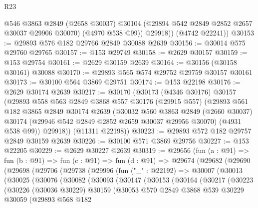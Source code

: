 \begin{lexlean}{R23}
\begin{coremodule}
            @546
            @3863
            @2849
            (@2658 @30037)
            @30104
            (@29894 @542 @2849 @2852 @2657 @30037 @29906 @30070)
            (@4970 @538 @99))
          @29918))
      (@4742 @22241))
@30153 := @29893 @576 @182 @29766 @2849 @30088 @2639
@30156 := @30014 @575 @29760 @29765
@30157 := @153 @29749
@30158 := @2629 @30157
@30159 := @153 @29754
@30161 := @2629 @30159 @2639
@30164 := @30156 (@30158 @30161) @30088
@30170 := @29893 @565 @574 @29752 @29759 @30157 @30161
@30173 := @30100 @564 @3869 @29751
@30174 := @153 @22198
@30176 := @2629 @30174 @2639
@30217 := @30170
    (@30173
      (@4346 @30176)
      @30157
      (@29893
        @558
        @563
        @2849
        @3868
        @557
        @30176
        (@29915 @557)
        (@29893
          @561
          @182
          @3865
          @2849
          @30174
          @2639
          (@30032
            @560
            @3863
            @2849
            (@2660 @30037)
            @30174
            (@29946 @542 @2849 @2852 @2659 @30037 @29956 @30070)
            (@4931 @538 @99))
          @29918))
      (@11311 @22198))
@30223 := @29893 @572 @182 @29757 @2849 @30159 @2639
@30226 := @30100 @571 @3869 @29756
@30227 := @153 @22205
@30229 := @2629 @30227 @2639
@30319 := @29656
    (fun (a : @91) =>
    fun (b : @91) =>
    fun (c : @91) =>
    fun (d : @91) =>
    @29674
      (@29682
        (@29690
          (@29698
            (@29706
              (@29738
                (@29996
                  (fun ("_" : @22192) =>
                  @30007
                    (@30013
                      (@30025
                        (@30076
                          (@30082
                            (@30093
                              (@30147
                                (@30153
                                  (@30164
                                    (@30217
                                      (@30223
                                        (@30226
                                          (@30036 @30229)
                                          @30159
                                          (@30053
                                            @570
                                            @2849
                                            @3868
                                            @539
                                            @30229
                                            @30059
                                            (@29893
                                              @568
                                              @182

\end{coremodule}
\end{lexlean}
